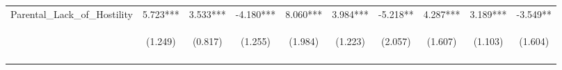 \begin{tabular}{lccccccccc}
\noalign{\smallskip}Parental_Lack_of_Hostility & 5.723*** & 3.533*** & -4.180*** & 8.060*** & 3.984*** & -5.218** & 4.287*** & 3.189*** & -3.549**\\
 & \begin{footnotesize}(1.249)\end{footnotesize} & \begin{footnotesize}(0.817)\end{footnotesize} & \begin{footnotesize}(1.255)\end{footnotesize} & \begin{footnotesize}(1.984)\end{footnotesize} & \begin{footnotesize}(1.223)\end{footnotesize} & \begin{footnotesize}(2.057)\end{footnotesize} & \begin{footnotesize}(1.607)\end{footnotesize} & \begin{footnotesize}(1.103)\end{footnotesize} & \begin{footnotesize}(1.604)\end{footnotesize}\\
\noalign{\smallskip}\hline\end{tabular}\\
